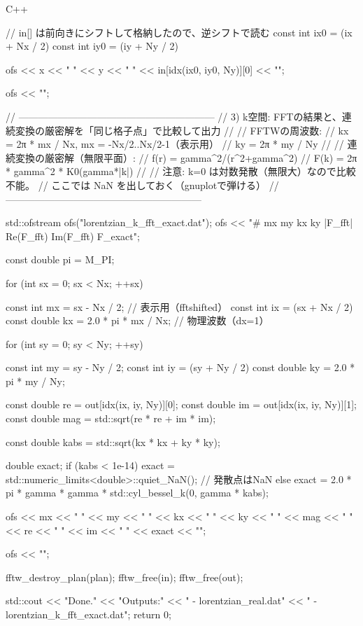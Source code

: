 \documentclass[12pt]{jreport}
\begin{document}
\begin{codebox}{C++}
{{{{                // in[] は前向きにシフトして格納したので、逆シフトで読む
                const int ix0 = (ix + Nx / 2) %
                const int iy0 = (iy + Ny / 2) %

                ofs << x << " " << y << " " << in[idx(ix0, iy0, Ny)][0] << "\n";
            }
            ofs << "\n";
        }
    }

    // ------------------------------------------------------------
    // 3) k空間: FFTの結果と、連続変換の厳密解を「同じ格子点」で比較して出力
    //
    // FFTWの周波数:
    //   kx = 2π * mx / Nx,   mx = -Nx/2..Nx/2-1（表示用）
    //   ky = 2π * my / Ny
    //
    // 連続変換の厳密解（無限平面）:
    //   f(r) = gamma^2/(r^2+gamma^2)
    //   F(k) = 2π * gamma^2 * K0(gamma*|k|)
    //
    // 注意: k=0 は対数発散（無限大）なので比較不能。
    //       ここでは NaN を出しておく（gnuplotで弾ける）
    // ------------------------------------------------------------
    {
        std::ofstream ofs("lorentzian_k_fft_exact.dat");
        ofs << "# mx my kx ky |F_fft| Re(F_fft) Im(F_fft) F_exact\n";

        const double pi = M_PI;

        for (int sx = 0; sx < Nx; ++sx) {
            const int mx = sx - Nx / 2;                 // 表示用（fftshifted）
            const int ix = (sx + Nx / 2) %
            const double kx = 2.0 * pi * mx / Nx;       // 物理波数（dx=1）

            for (int sy = 0; sy < Ny; ++sy) {
                const int my = sy - Ny / 2;
                const int iy = (sy + Ny / 2) %
                const double ky = 2.0 * pi * my / Ny;

                const double re = out[idx(ix, iy, Ny)][0];
                const double im = out[idx(ix, iy, Ny)][1];
                const double mag = std::sqrt(re * re + im * im);

                const double kabs = std::sqrt(kx * kx + ky * ky);

                double exact;
                if (kabs < 1e-14) {
                    exact = std::numeric_limits<double>::quiet_NaN();  // 発散点はNaN
                } else {
                    exact = 2.0 * pi * gamma * gamma * std::cyl_bessel_k(0, gamma * kabs);
                }

                ofs << mx << " " << my << " "
                    << kx << " " << ky << " "
                    << mag << " " << re << " " << im << " "
                    << exact << "\n";
            }
            ofs << "\n";
        }
    }

    fftw_destroy_plan(plan);
    fftw_free(in);
    fftw_free(out);

    std::cout << "Done.\n"
              << "Outputs:\n"
              << "  - lorentzian_real.dat\n"
              << "  - lorentzian_k_fft_exact.dat\n";
    return 0;
}

\end{codebox}
\end{document}

